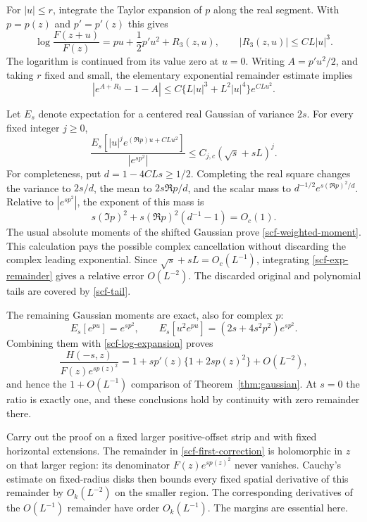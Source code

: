 \documentclass[11pt]{article}
\theoremstyle{remark}
\begin{document}
For $|u|\le r$, integrate the Taylor expansion of $p$ along the real
segment.  With $p=p(z)$ and $p'=p'(z)$ this gives
\begin{equation}\label{scf-log-expansion}
 \log\frac{F(z+u)}{F(z)}=pu+\frac12p'u^2+R_3(z,u),
 \qquad |R_3(z,u)|\le CL|u|^3.
\end{equation}
The logarithm is continued from its value zero at $u=0$.
Writing $A=p'u^2/2$, and taking $r$ fixed and small, the elementary
exponential remainder estimate implies
\begin{equation}\label{scf-exp-remainder}
 |e^{A+R_3}-1-A|
 \le C\{L|u|^3+L^2|u|^4\}e^{CLu^2}.
\end{equation}

Let $E_s$ denote expectation for a centered real Gaussian of variance
$2s$.  For every fixed integer $j\ge0$,
\begin{equation}\label{scf-weighted-moment}
 \frac{E_s[|u|^j e^{(\Re p)u+CLu^2}]}{|e^{sp^2}|}
 \le C_{j,c}(\sqrt{s}+sL)^j.
\end{equation}
For completeness, put $d=1-4CLs\ge1/2$.  Completing the real square
changes the variance to $2s/d$, the mean to $2s\Re p/d$, and the scalar
mass to $d^{-1/2}e^{s(\Re p)^2/d}$.  Relative to $|e^{sp^2}|$, the
exponent of this mass is
\[
 s(\Im p)^2+s(\Re p)^2(d^{-1}-1)=O_c(1).
\]
The usual absolute moments of the shifted Gaussian prove
\eqref{scf-weighted-moment}.  This calculation pays the possible complex
cancellation without discarding the complex leading exponential.
Since $\sqrt{s}+sL=O_c(L^{-1})$, integrating
\eqref{scf-exp-remainder} gives a relative error $O(L^{-2})$.
The discarded original and polynomial tails are covered by
\eqref{scf-tail}.

The remaining Gaussian moments are exact, also for complex $p$:
\[
 E_s[e^{pu}]=e^{sp^2},\qquad
 E_s[u^2e^{pu}]=(2s+4s^2p^2)e^{sp^2}.
\]
Combining them with \eqref{scf-log-expansion} proves
\begin{equation}\label{scf-first-correction}
 \frac{H(-s,z)}{F(z)e^{sp(z)^2}}
 =1+sp'(z)\{1+2sp(z)^2\}+O(L^{-2}),
\end{equation}
and hence the $1+O(L^{-1})$ comparison of
Theorem~\ref{thm:gaussian}.  At $s=0$ the ratio is exactly one, and
these conclusions hold by continuity with zero remainder there.

Carry out the proof on a fixed larger positive-offset strip and with
fixed horizontal extensions.  The remainder in
\eqref{scf-first-correction} is holomorphic in $z$ on that larger
region: its denominator $F(z)e^{sp(z)^2}$ never vanishes.
Cauchy's estimate on fixed-radius disks then bounds every fixed spatial
derivative of this remainder by $O_k(L^{-2})$ on the smaller region.
The corresponding derivatives of the $O(L^{-1})$ remainder have order
$O_k(L^{-1})$.  The margins are essential here.
\end{document}
